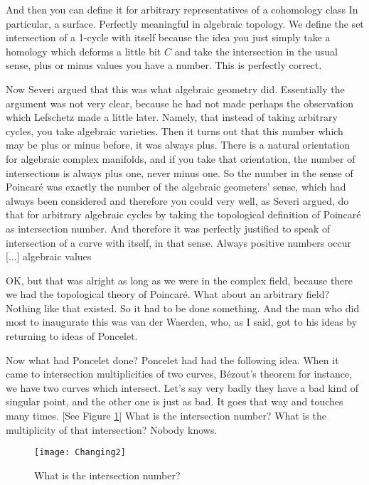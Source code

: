 \documentclass{article}
\begin{document}
And then you can define it for arbitrary representatives of a cohomology class
In particular, a surface. 
Perfectly meaningful in algebraic topology.
We define the set intersection of a 1-cycle with itself
because the idea you just simply
take a homology which deforms a little bit $C$
and take the intersection in the usual sense,
plus or minus values you have a number.
This is perfectly correct.

Now Severi argued that this was what algebraic geometry did.
Essentially the argument was not very clear,
because he had not made perhaps the observation
which Lefschetz made a little later.
Namely, that instead of taking arbitrary cycles,
you take algebraic varieties.
Then it turns out that this number which may be plus or minus before, 
it was always plus. 
There is a natural orientation for algebraic complex manifolds,
and if you take that orientation, the number of intersections
is always plus one, never minus one.
So the number in the sense of Poincar\'e
was exactly the number of the algebraic geometers' sense,
which had always been considered
and therefore you could very well,
as Severi argued, 
do that for arbitrary algebraic cycles
by taking the topological definition of Poincar\'e as intersection number.
And therefore it was perfectly justified to speak 
of intersection of a curve with itself,
in that sense.
Always positive numbers occur [...] algebraic values

OK, but that was alright as long 
as we were in the complex field,
because there we had the topological theory of Poincar\'e.
What about an arbitrary field?
Nothing like that existed.
So it had to be done something.
And the man who did most to inaugurate this 
was van der Waerden,
who, as I said, got to his ideas 
by returning to ideas of Poncelet.

Now what had Poncelet done?
Poncelet had had the following idea.
When it came to intersection multiplicities of two curves,
B\'ezout's theorem for instance,
we have two curves which intersect.
Let's say very badly they have 
a bad kind of singular point,
and the other one is just as bad.
It goes that way and touches many times. [See Figure \ref{fig:intersection}]
What is the intersection number?
What is the multiplicity of that intersection?
Nobody knows.

\begin{figure}[ht]
\caption{What is the intersection number?}
\label{fig:intersection}
\centering
\texttt{[image: Changing2]}
\end{figure}
\end{document}

